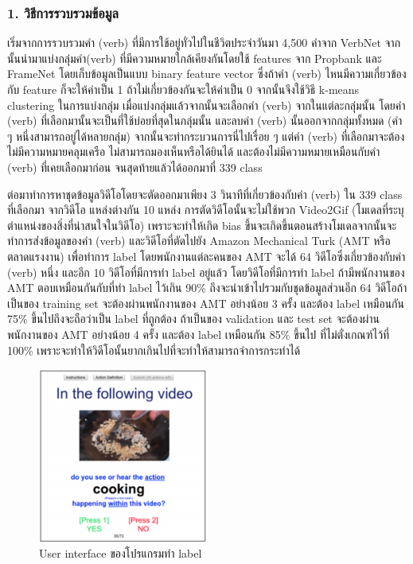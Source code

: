 \subsubsection*{1. วิธีการรวบรวมข้อมูล}
เริ่มจากการรวบรวมคำ (verb) ที่มีการใช้อยู่ทั่วไปในชีวิตประจำวันมา 4,500 คำจาก VerbNet จากนั้นนำมาแบ่งกลุ่มคำ(verb) ที่มีความหมายใกล้เคียงกันโดยใช้ features จาก Propbank และ FrameNet โดยเก็บข้อมูลเป็นแบบ binary feature vector ซึ่งถ้าคำ (verb) ไหนมีความเกี่ยวข้องกับ feature ก็จะให้ค่าเป็น 1 ถ้าไม่เกี่ยวข้องกันจะให้ค่าเป็น 0 จากนั้นจึงใช้วิธี k-means clustering ในการแบ่งกลุ่ม เมื่อแบ่งกลุ่มแล้วจากนั้นจะเลือกคำ (verb) จากในแต่ละกลุ่มนั้น โดยคำ (verb) ที่เลือกมานั้นจะเป็นที่ใช้บ่อยที่สุดในกลุ่มนั้น และลบคำ (verb) นั้นออกจากกลุ่มทั้งหมด (คำ ๆ หนึ่งสามารถอยู่ได้หลายกลุ่ม) จากนั้นจะทำกระบวนการนี่ไปเรื่อย ๆ แต่คำ (verb) ที่เลือกมาจะต้องไม่มีความหมายคลุมเครือ ไม่สามารถมองเห็นหรือได้ยินได้ และต้องไม่มีความหมายเหมือนกับคำ (verb) ที่เคยเลือกมาก่อน จนสุดท้ายแล้วได้ออกมาที่ 339 class
\par
ต่อมาทำการหาชุดข้อมูลวิดีโอโดยจะตัดออกมาเพียง 3 วินาทีที่เกี่ยวข้องกับคำ (verb) ใน 339 class ที่เลือกมา จากวิดีโอ แหล่งต่างกัน 10 แหล่ง การตัดวิดีโอนั้นจะไม่ใช้พวก Video2Gif (โมเดลที่ระบุตำแหน่งของสิ่งที่น่าสนใจในวิดีโอ) เพราะจะทำให้เกิด bias ขึ้นจะเกิดขึ้นตอนสร้างโมเดลจากนั้นจะทำการส่งข้อมูลของคำ (verb) และวิดีโอที่ตัดไปยัง Amazon Mechanical Turk (AMT หรือตลาดแรงงาน) เพื่อทำการ label โดยพนักงานแต่ละคนของ AMT จะได้ 64 วิดีโอซึ่งเกี่ยวข้องกับคำ (verb) หนึ่ง และอีก 10 วิดีโอที่มีการทำ label อยู่แล้ว โดยวิดีโอที่มีการทำ label ถ้ามีพนักงานของ AMT ตอบเหมือนกันกับที่ทำ label ไว้เกิน 90\% ถึงจะนำเข้าไปรวมกับชุดข้อมูลส่วนอีก 64 วิดีโอถ้าเป็นของ training set จะต้องผ่านพนักงานของ AMT อย่างน้อย 3 ครั้ง และต้อง label เหมือนกัน 75\% ขึ้นไปถึงจะถือว่าเป็น label ที่ถูกต้อง ถ้าเป็นของ validation และ test set จะต้องผ่านพนักงานของ AMT อย่างน้อย 4 ครั้ง และต้อง label เหมือนกัน 85\% ขึ้นไป ที่ไม่ตั่งเกณฑ์ไว้ที่ 100\% เพราะจะทำให้วิดีโอนั้นยากเกินไปที่จะทำให้สามารถจำการกระทำได้

\begin{figure}[!ht]
	\centering
	\includegraphics[width=0.5\textwidth]{chapter2/images/UI.png}
		\caption{User interface ของโปรแกรมทำ label}
    	\label{fig:User interface}
\end{figure}
\clearpage
